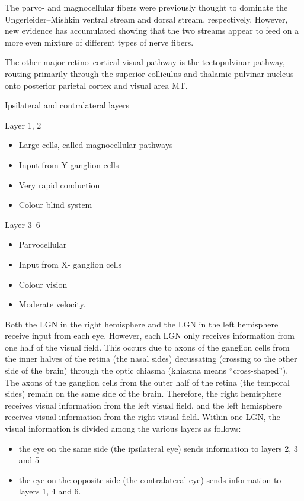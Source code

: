 The parvo- and magnocellular fibers were previously thought to dominate the Ungerleider--Mishkin ventral stream and dorsal stream, respectively. However, new evidence has accumulated showing that the two streams appear to feed on a more even mixture of different types of nerve fibers.

The other major retino--cortical visual pathway is the tectopulvinar pathway, routing primarily through the superior colliculus and thalamic pulvinar nucleus onto posterior parietal cortex and visual area MT.

Ipsilateral and contralateral layers

Layer 1, 2

\begin{itemize}
\tightlist
\item
  Large cells, called magnocellular pathways
\item
  Input from Y-ganglion cells
\item
  Very rapid conduction
\item
  Colour blind system
\end{itemize}

Layer 3--6

\begin{itemize}
\tightlist
\item
  Parvocellular
\item
  Input from X- ganglion cells
\item
  Colour vision
\item
  Moderate velocity.
\end{itemize}

Both the LGN in the right hemisphere and the LGN in the left hemisphere receive input from each eye. However, each LGN only receives information from one half of the visual field. This occurs due to axons of the ganglion cells from the inner halves of the retina (the nasal sides) decussating (crossing to the other side of the brain) through the optic chiasma (khiasma means ``cross-shaped''). The axons of the ganglion cells from the outer half of the retina (the temporal sides) remain on the same side of the brain. Therefore, the right hemisphere receives visual information from the left visual field, and the left hemisphere receives visual information from the right visual field. Within one LGN, the visual information is divided among the various layers as follows:

\begin{itemize}
\tightlist
\item
  the eye on the same side (the ipsilateral eye) sends information to layers 2, 3 and 5
\item
  the eye on the opposite side (the contralateral eye) sends information to layers 1, 4 and 6.
\end{itemize}


